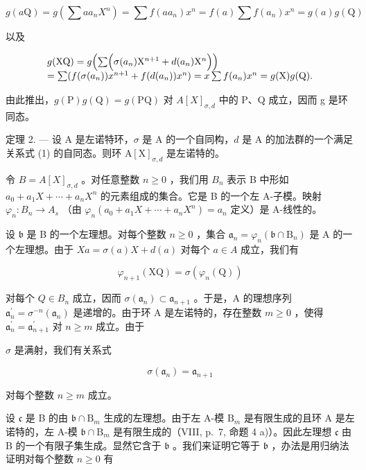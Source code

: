 \[
g (a \mathrm{Q}) = g \left(\sum a a _ {n} X ^ {n}\right) = \sum f (a a _ {n}) x ^ {n} = f (a) \sum f (a _ {n}) x ^ {n} = g (a) g (\mathrm{Q})
\]

以及

\[
\begin{array}{l} g (\mathrm{XQ}) = g \Bigl (\sum \Bigl (\sigma (a _ {n}) \mathrm{X} ^ {n + 1} + d (a _ {n}) \mathrm{X} ^ {n} \Bigr) \Bigr) \\ = \sum (f (\sigma (a _ {n})) x ^ {n + 1} + f (d (a _ {n})) x ^ {n}) = x \sum f (a _ {n}) x ^ {n} = g (\mathrm{X}) g (\mathrm{Q}). \end{array}
\]

由此推出，\(g(\mathrm{P})g(\mathrm{Q}) = g(\mathrm{PQ})\) 对 \(A[X]_{\sigma,d}\) 中的 P、Q 成立，因而 g 是环同态。

定理 2. --- 设 A 是左诺特环，\(\sigma\) 是 A 的一个自同构，\(d\) 是 A 的加法群的一个满足关系式 (1) 的自同态。则环 \(\mathrm{A}[\mathrm{X}]_{\sigma,d}\) 是左诺特的。

令 \(B = A[X]_{\sigma,d}\) 。对任意整数 \(n \geqslant 0\) ，我们用 \(B_{n}\) 表示 B 中形如 \(a_{0} + a_{1}X + \cdots + a_{n}X^{n}\) 的元素组成的集合。它是 B 的一个左 A-子模。映射 \(\varphi_{n}: B_{n} \to A_{s}\) （由 \(\varphi_{n}(a_{0} + a_{1}X + \cdots + a_{n}X^{n}) = a_{n}\) 定义）是 A-线性的。

设 \(\mathfrak{b}\) 是 B 的一个左理想。对每个整数 \(n \geqslant 0\) ，集合 \(\mathfrak{a}_n = \varphi_n(\mathfrak{b} \cap \mathrm{B}_n)\) 是 A 的一个左理想。由于 \(Xa = \sigma(a)X + d(a)\) 对每个 \(a \in A\) 成立，我们有

\[
\varphi_ {n + 1} (\mathrm{XQ}) = \sigma (\varphi_ {n} (\mathrm{Q}))\tag{6}
\]

对每个 \(Q \in B_{n}\) 成立，因而 \(\sigma(\mathfrak{a}_{n}) \subset \mathfrak{a}_{n+1}\) 。于是，A 的理想序列 \(\mathfrak{a}_{n}^{\prime} = \sigma^{-n}(\mathfrak{a}_{n})\) 是递增的。由于环 A 是左诺特的，存在整数 \(m \geqslant 0\) ，使得 \(\mathfrak{a}_{n}^{\prime} = \mathfrak{a}_{n+1}^{\prime}\) 对 \(n \geqslant m\) 成立。由于

\(\sigma\) 是满射，我们有关系式

\[
\sigma (\mathfrak {a} _ {n}) = \mathfrak {a} _ {n + 1}\tag{7}
\]

对每个整数 \(n \geqslant m\) 成立。

设 \(\mathfrak{c}\) 是 B 的由 \(\mathfrak{b} \cap \mathrm{B}_m\) 生成的左理想。由于左 A-模 \(\mathrm{B}_m\) 是有限生成的且环 A 是左诺特的，左 A-模 \(\mathfrak{b} \cap \mathrm{B}_m\) 是有限生成的（VIII, p.~7, 命题 4 a)）。因此左理想 \(\mathfrak{c}\) 由 B 的一个有限子集生成。显然它含于 \(\mathfrak{b}\) 。我们来证明它等于 \(\mathfrak{b}\) ，办法是用归纳法证明对每个整数 \(n \geqslant 0\) 有

